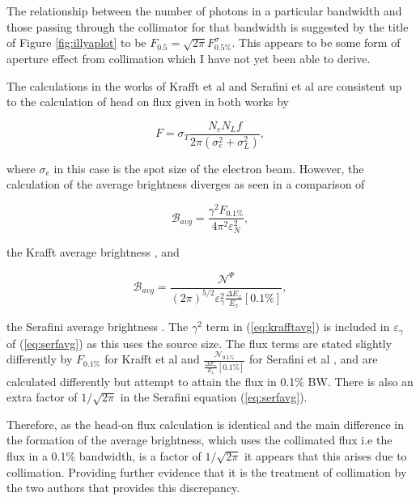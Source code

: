 \documentclass[10pt]{article}
\begin{document}
The relationship between the number of photons in a particular bandwidth and those passing through the collimator for that bandwidth is suggested by the title of Figure \ref{fig:illyaplot} to be $F_{0.5} = \sqrt{2\pi} F^{\sigma}_{0.5\%}$. This appears to be some form of aperture effect from collimation which I have not yet been able to derive.

The calculations in the works of Krafft et al \cite{deitrick2018high} and Serafini et al \cite{curatolo2017analytical} are consistent up to the calculation of head on flux given in both works by 

\begin{equation}
F = \sigma_{T}\frac{N_{e}N_{L}f}{2\pi\left(\sigma^{2}_{e}+\sigma^{2}_{L}\right)},
\label{eq:headflux}
\end{equation}

where $\sigma_{e}$ in this case is the spot size of the electron beam. However, the calculation of the average brightness diverges as seen in a comparison of

\begin{equation}
\mathcal{B}_{avg} = \frac{\gamma^{2}F_{0.1\%}}{4\pi^{2}\varepsilon_{N}^{2}},
\label{eq:krafftavg}
\end{equation}

the Krafft average brightness \cite{deitrick2018high}, and

\begin{equation}
\mathcal{B}_{avg} = \frac{\mathcal{N}^{\Psi}}{\left(2\pi\right)^{5/2}\varepsilon_{\gamma}^{2}\frac{\Delta E_{x}}{E_{x}}\left[0.1\%\right]},
\label{eq:serfavg}
\end{equation}

the Serafini average brightness \cite{curatolo2017analytical}. The $\gamma^{2}$ term in (\ref{eq:krafftavg}) is included in $\varepsilon_{\gamma}$ of (\ref{eq:serfavg}) as this uses the source size. The flux terms are stated slightly differently by $F_{0.1\%}$ for Krafft et al and $\frac{\mathcal{N}_{0.1\%}}{\frac{\Delta E_{x}}{E_{x}}\left[0.1\%\right]}$ for Serafini et al \cite{curatolo2017analytical}, and are calculated differently but attempt to attain the flux in 0.1\% BW. There is also an extra factor of $1/\sqrt{2\pi}$ in the Serafini equation (\ref{eq:serfavg}).

Therefore, as the head-on flux calculation is identical and the main difference in the formation of the average brightness, which uses the collimated flux i.e the flux in a 0.1\% bandwidth, is a factor of $1/\sqrt{2\pi}$ it appears that this arises due to collimation. Providing further evidence that it is the treatment of collimation by the two authors that provides this discrepancy.
\end{document}
